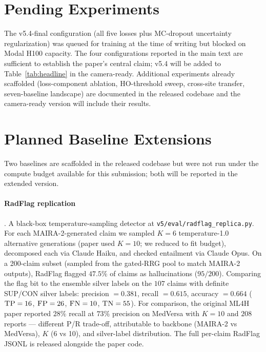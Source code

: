 \documentclass[pmlr]{jmlr}
\begin{document}
\section{Pending Experiments}

The v5.4-final configuration (all five losses plus MC-dropout uncertainty regularization) was queued for training at the time of writing but blocked on Modal H100 capacity. The four configurations reported in the main text are sufficient to establish the paper's central claim; v5.4 will be added to Table~\ref{tab:headline} in the camera-ready. Additional experiments already scaffolded (loss-component ablation, HO-threshold sweep, cross-site transfer, seven-baseline landscape) are documented in the released codebase and the camera-ready version will include their results.

\section{Planned Baseline Extensions}
\label{app:planned-baselines}

Two baselines are scaffolded in the released codebase but were not run under the compute budget available for this submission; both will be reported in the extended version.

\paragraph{RadFlag replication} \citep{zhang2024radflag}. A black-box temperature-sampling detector at \texttt{v5/eval/radflag\_replica.py}. For each MAIRA-2-generated claim we sampled $K=6$ temperature-1.0 alternative generations (paper used $K=10$; we reduced to fit budget), decomposed each via Claude Haiku, and checked entailment via Claude Opus. On a 200-claim subset (sampled from the gated-RRG pool to match MAIRA-2 outputs), RadFlag flagged $47.5\%$ of claims as hallucinations ($95/200$). Comparing the flag bit to the ensemble silver labels on the $107$ claims with definite \textsc{SUP}/\textsc{CON} silver labels: precision $= 0.381$, recall $= 0.615$, accuracy $= 0.664$ ($\textsc{TP}=16$, $\textsc{FP}=26$, $\textsc{FN}=10$, $\textsc{TN}=55$). For comparison, the original ML4H paper reported $28\%$ recall at $73\%$ precision on MedVersa with $K=10$ and $208$ reports — different P/R trade-off, attributable to backbone (MAIRA-2 vs MedVersa), $K$ (6 vs 10), and silver-label distribution. The full per-claim RadFlag JSONL is released alongside the paper code.
\end{document}
